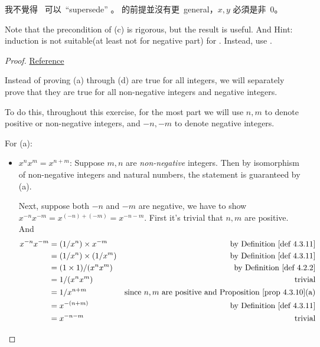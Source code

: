 \begin{note}
我不覺得\  可以\ ``supersede'' 。 的前提並沒有更\ general，\(x, y\) 必須是非\ \(0\)。 
\end{note}

\begin{note}
Note that the precondition of (c) is rigorous, but the result is useful.
And Hint: induction is not suitable(at least not for negative part) for .
Instead, use .
\end{note}

\begin{proof}

\href{https://taoanalysis.wordpress.com/2020/04/30/exercise-4-3-4/}{Reference}

Instead of proving (a) through (d) are true for all integers, we will separately prove that they are true for all non-negative integers and negative integers.

To do this, throughout this exercise, for the most part we will use \(n, m\) to denote positive or non-negative integers, and \(-n,-m\) to denote negative integers.

For (a):
\begin{itemize}
    \item \(x^nx^m = x^{n + m}\):
        Suppose \(m, n\) are \emph{non-negative} integers. Then by isomorphism of non-negative integers and natural numbers, the statement is guaranteed by (a).
        
        Next, suppose both \(-n\) and \(-m\) are negative, we have to show \(x^{-n}x^{-m} = x^{(-n) + (-m)} = x^{-n - m}\).
        First it's trivial that \(n, m\) are positive. And
        \begin{align*}
            x^{-n}x^{-m} & = (1/x^n) \X x^{-m} & \text{by \DEF{4.3.11}} \\
                         & = (1/x^n) \X (1/x^m) & \text{by \DEF{4.3.11}} \\
                         & = (1 \X 1) / (x^n x^m) & \text{by \DEF{4.2.2}} \\
                         & = 1 / (x^n x^m) & \text{trivial} \\
                         & = 1 / x^{n + m} & \text{since \(n, m\) are positive and \PROP{4.3.10}(a)} \\
                         & = x^{-(n + m)} & \text{by \DEF{4.3.11}} \\
                         & = x^{-n - m} & \text{trivial}
        \end{align*}
        

\end{itemize}
\end{proof}
